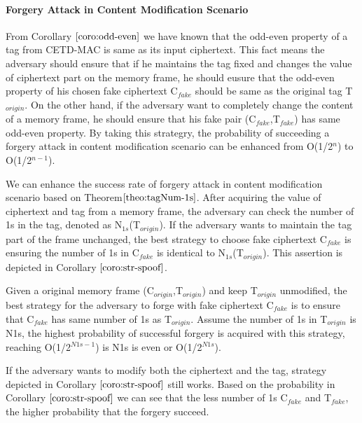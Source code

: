 \paragraph{Forgery Attack in Content Modification Scenario}
From Corollary $\ref{coro:odd-even}$ we have known that the odd-even property of a tag from CETD-MAC is same as its input ciphertext. 
This fact means the adversary should ensure that if he maintains the tag fixed and changes the value of ciphertext part on the memory frame, he should eusure that the odd-even property of his chosen fake ciphertext C$_{fake}$ should be same as the original tag T$_{origin}$. On the other hand, if the adversary want to completely change the content of a memory frame, he should ensure that his fake pair (C$_{fake}$,T$_{fake}$) has same odd-even property. By taking this strategry, the probability of succeeding a forgery attack in content modification scenario can be enhanced from O(1/2$^n$) to O(1/2$^{n-1}$).

We can enhance the success rate of forgery attack in content modification scenario based on Theorem$\ref{theo:tagNum-1s}$. After acquiring the value of ciphertext and tag from a memory frame, the adversary can check the number of 1s in the tag, denoted as N$_{1s}$(T$_{origin}$). If the adversary wants to maintain the tag part of the frame unchanged, the best strategy to choose fake ciphertext C$_{fake}$ is ensuring the number of 1s in C$_{fake}$ is identical to N$_{1s}$(T$_{origin}$). This assertion is depicted in Corollary $\ref{coro:str-spoof}$. 
\begin{corollary}\label{coro:str-spoof}
Given a original memory frame (C$_{origin}$,T$_{origin}$) and keep T$_{origin}$ unmodified, the best strategy for the adversary to forge with fake ciphertext C$_{fake}$ is to ensure that C$_{fake}$ has same number of 1s as T$_{origin}$. Assume the number of 1s in T$_{origin}$ is N1s, the highest probability of successful forgery is acquired with this strategy, reaching O(1/2$^{N1s-1}$) is N1s is even or O(1/2$^{N1s}$).   
\end{corollary}
If the adversary wants to modify both the ciphertext and the tag, strategy depicted in Corollary $\ref{coro:str-spoof}$ still works. Based on the probability in Corollary $\ref{coro:str-spoof}$ we can see that the less number of 1s C$_{fake}$ and T$_{fake}$, the higher probability that the forgery succeed.  

